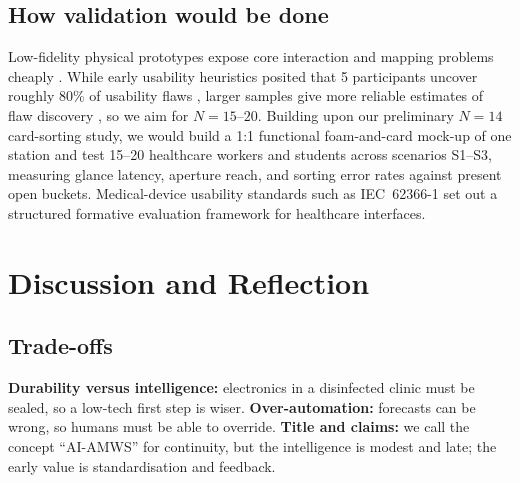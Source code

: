\documentclass[10pt,twocolumn,a4paper]{article}
\begin{document}
\subsection{How validation would be done}
Low-fidelity physical prototypes expose core interaction and mapping problems cheaply \cite{rettig1994}. While early usability heuristics posited that 5 participants uncover roughly 80\% of usability flaws \cite{virzi1992}, larger samples give more reliable estimates of flaw discovery \cite{faulkner2003}, so we aim for $N=15$--$20$. Building upon our preliminary $N=14$ card-sorting study, we would build a 1:1 functional foam-and-card mock-up of one station and test 15--20 healthcare workers and students across scenarios S1--S3, measuring glance latency, aperture reach, and sorting error rates against present open buckets. Medical-device usability standards such as IEC~62366-1 \cite{iec62366} set out a structured formative evaluation framework for healthcare interfaces.

\section{Discussion and Reflection}
\subsection{Trade-offs}
\textbf{Durability versus intelligence:} electronics in a disinfected clinic must be sealed, so a low-tech first step is wiser. \textbf{Over-automation:} forecasts can be wrong, so humans must be able to override. \textbf{Title and claims:} we call the concept ``AI-AMWS'' for continuity, but the intelligence is modest and late; the early value is standardisation and feedback.
\end{document}
